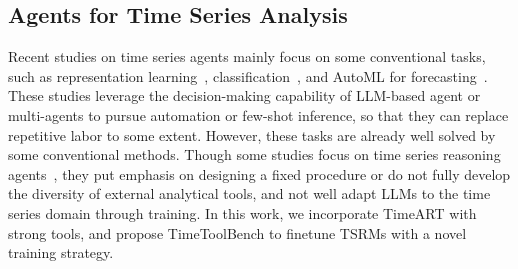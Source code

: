 \subsection{Agents for Time Series Analysis}
Recent studies on time series agents mainly focus on some conventional tasks, such as representation learning~\citep{zhou2025merit}, classification~\citep{sui2025training}, and AutoML for forecasting~\citep{zhao2025timeseriesscientist,wang2025aries}. These studies leverage the decision-making capability of LLM-based agent or multi-agents to pursue automation or few-shot inference, so that they can replace repetitive labor to some extent. However, these tasks are already well solved by some conventional methods. Though some studies focus on time series reasoning agents~\citep{liu2025tsagenttimeseriesreasoning,ye2025beyond}, they put emphasis on designing a fixed procedure or do not fully develop the diversity of external analytical tools, and not well adapt LLMs to the time series domain through training. In this work, we incorporate TimeART with strong tools, and propose TimeToolBench to finetune TSRMs with a novel training strategy. 
